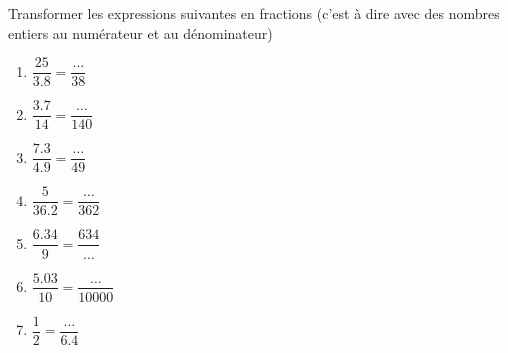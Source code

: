 
\begin{exercice}\label{exosmath-0868}

    Transformer les expressions suivantes en fractions (c'est à dire avec des nombres entiers au numérateur et au dénominateur)
    \begin{multicols}{2}
    \begin{enumerate}
        \item
            \( \dfrac{ 25 }{ 3.8 }=\dfrac{ \ldots }{ 38 }\)
        \item
            \( \dfrac{  3.7  }{  14  }=\dfrac{  \ldots  }{ 140 }\)
        \item
            \( \dfrac{  7.3  }{  4.9  }=\dfrac{  \ldots  }{ 49 }\)
        \item
            \( \dfrac{  5  }{  36.2  }=\dfrac{ \ldots   }{ 362 }\)
        \item
            \( \dfrac{  6.34  }{  9  }=\dfrac{  634  }{ \ldots }\)
        \item
            \( \dfrac{  5.03  }{  10  }=\dfrac{  \ldots  }{ 10000 }\)
        \item
            \( \dfrac{ 1 }{ 2 }=\dfrac{ \ldots }{ 6.4 }\)
    \end{enumerate}
    \end{multicols}


\end{exercice}
